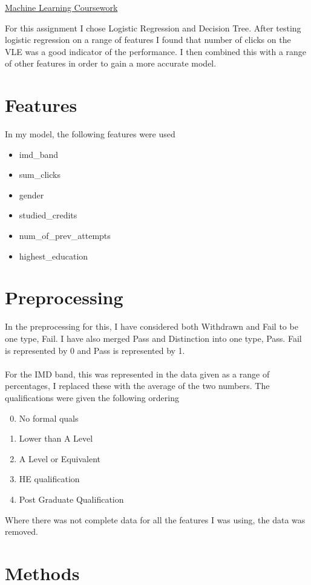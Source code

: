 \documentclass{article}[18pt]
\begin{document}
\begin{center}
\underline{\huge Machine Learning Coursework}
\end{center}
For this assignment I chose Logistic Regression and Decision Tree. After testing logistic regression on a range of features I found that number of clicks on the VLE was a good indicator of the performance. I then combined this with a range of other features in order to gain a more accurate model.
\section{Features}
In my model, the following features were used
\begin{itemize}
	\item imd\_band
	\item sum\_clicks
	\item gender
	\item studied\_credits
	\item num\_of\_prev\_attempts
	\item highest\_education
	
\end{itemize}



\section{Preprocessing}
In the preprocessing for this, I have considered both Withdrawn and Fail to be one type, Fail. I have also merged Pass and Distinction into one type, Pass. Fail is represented by 0 and Pass is represented by 1.\\
\\
For the IMD band, this was represented in the data given as a range of percentages, I replaced these with the average of the two numbers. The qualifications were given the following ordering
\begin{enumerate}
	  \setcounter{enumi}{-1}
	\item No formal quals
	\item Lower than A Level
	\item A Level or Equivalent
	\item HE qualification
	\item Post Graduate Qualification
\end{enumerate}
Where there was not complete data for all the features I was using, the data was removed.
\section{Methods}
\end{document}
